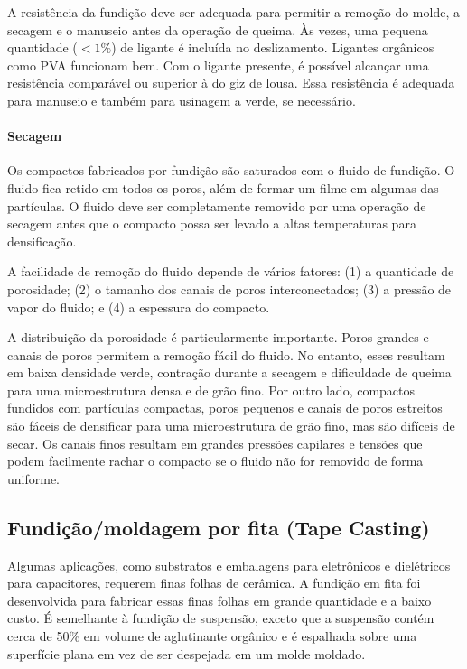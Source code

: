 A resistência da fundição deve ser adequada para permitir a remoção do molde, a secagem e o manuseio antes da operação de queima. Às vezes, uma pequena quantidade ($<1\%$) de ligante é incluída no deslizamento. Ligantes orgânicos como PVA funcionam bem. Com o ligante presente, é possível alcançar uma resistência comparável ou superior à do giz de lousa. Essa resistência é adequada para manuseio e também para usinagem a verde, se necessário.

\paragraph*{Secagem}

Os compactos fabricados por fundição são saturados com o fluido de fundição. O fluido fica retido em todos os poros, além de formar um filme em algumas das partículas. O fluido deve ser completamente removido por uma operação de secagem antes que o compacto possa ser levado a altas temperaturas para densificação.

A facilidade de remoção do fluido depende de vários fatores: (1) a quantidade de porosidade; (2) o tamanho dos canais de poros interconectados; (3) a pressão de vapor do fluido; e (4) a espessura do compacto.

A distribuição da porosidade é particularmente importante. Poros grandes e canais de poros permitem a remoção fácil do fluido. No entanto, esses resultam em baixa densidade verde, contração durante a secagem e dificuldade de queima para uma microestrutura densa e de grão fino. Por outro lado, compactos fundidos com partículas compactas, poros pequenos e canais de poros estreitos são fáceis de densificar para uma microestrutura de grão fino, mas são difíceis de secar. Os canais finos resultam em grandes pressões capilares e tensões que podem facilmente rachar o compacto se o fluido não for removido de forma uniforme.

\subsection*{Fundição/moldagem por fita (Tape Casting)}

Algumas aplicações, como substratos e embalagens para eletrônicos e dielétricos para capacitores, requerem finas folhas de cerâmica. A fundição em fita foi desenvolvida para fabricar essas finas folhas em grande quantidade e a baixo custo. É semelhante à fundição de suspensão, exceto que a suspensão contém cerca de 50\% em volume de aglutinante orgânico e é espalhada sobre uma superfície plana em vez de ser despejada em um molde moldado.

